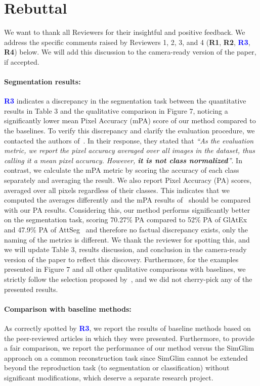\documentclass{article}
\newcommand{\Rone}{{\textbf{\textcolor{JungleGreen}{R1}}}}
\newcommand{\Rtwo}{{\textbf{\textcolor{BurntOrange}{R2}}}}
\newcommand{\Rthree}{{\textbf{\textcolor{Blue}{R3}}}}
\newcommand{\Rfour}{{\textbf{\textcolor{RedViolet}{R4}}}}
\begin{document}
\section*{Rebuttal}

We want to thank all Reviewers for their insightful and positive feedback. We address the specific comments raised by Reviewers 1, 2, 3, and 4 (\Rone, \Rtwo, \Rthree, \Rfour) below. We will add this discussion to the camera-ready version of the paper, if accepted. 

\paragraph{Segmentation results:}
\Rthree{} indicates a discrepancy in the segmentation task between the quantitative results in Table 3 and the qualitative comparison in Figure 7, noticing a significantly lower mean Pixel Accuracy (mPA) score of our method compared to the baselines. To verify this discrepancy and clarify the evaluation procedure, we contacted the authors of~\cite{seifi2021glimpse,seifi2020segment}. In their response, they stated that \emph{``As the evaluation metric, we report the pixel accuracy averaged over all images in the dataset, thus calling it a mean pixel accuracy. However, \textbf{it is not class normalized}''}. In contrast, we calculate the mPA metric by scoring the accuracy of each class separately and averaging the result. We also report Pixel Accuracy (PA) scores, averaged over all pixels regardless of their classes. This indicates that we computed the averages differently and the mPA results of~\cite{seifi2021glimpse,seifi2020segment} should be compared with our PA results. Considering this, our method performs significantly better on the segmentation task, scoring 70.27\% PA compared to 52\% PA of GlAtEx~\cite{seifi2021glimpse} and 47.9\% PA of AttSeg~\cite{seifi2020segment} and therefore no factual discrepancy exists, only the naming of the metrics is different. We thank the reviewer for spotting this, and we will update Table 3, results discussion, and conclusion in the camera-ready version of the paper to reflect this discovery. Furthermore, for the examples presented in Figure 7 and all other qualitative comparisons with baselines, we strictly follow the selection proposed by~\cite{seifi2021glimpse,Jha2023WACV}, and we did not cherry-pick any of the presented results.  

\paragraph{Comparison with baseline methods:}
As correctly spotted by \Rthree{}, we report the results of baseline methods based on the peer-reviewed articles in which they were presented. Furthermore, to provide a fair comparison, we report the performance of our method versus the SimGlim~\cite{Jha2023WACV} approach on a common reconstruction task since SimGlim cannot be extended beyond the reproduction task (to segmentation or classification) without significant modifications, which deserve a separate research project.
\end{document}
